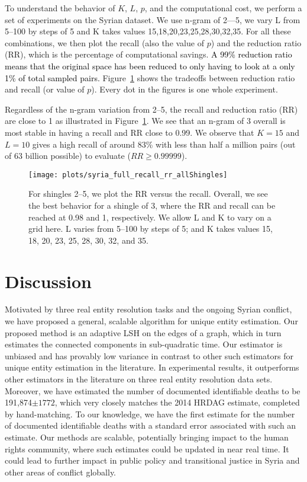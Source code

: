 \documentclass{imsart}
\begin{document}
To understand the behavior of $K$, $L$, $p$, and the computational cost, we perform a set of experiments on the Syrian dataset.  We use n-gram of 2---5, we vary L from 5--100 by steps of 5 and K takes values 15,18,20,23,25,28,30,32,35. For all these combinations, we then plot the recall (also the value of $p$) and the reduction ratio (RR), which is the percentage of computational savings. \textcolor{black}{A 99\% reduction ratio means that the original space has been reduced to only having to look at a
only 1\% of total sampled pairs.} Figure~\ref{syria-takethatAssad} shows the tradeoffs between reduction ratio and recall (or value of $p$). Every dot in the figures is one whole experiment.

Regardless of the n-gram variation from 2--5, the recall and reduction ratio (RR) are close to 1 as illustrated in Figure~\ref{syria-takethatAssad}. We see that an n-gram of 3 overall is most stable in having a recall and RR close to 0.99. We observe that $K=15$ and $L=10$ gives a high recall of around 83\% with less than half a million pairs (out of 63 billion possible) to evaluate ($RR \ge 0.99999$).

\begin{figure}[htbp]
\begin{center}
\texttt{[image: plots/syria\_full\_recall\_rr\_allShingles]}
\caption{For shingles 2--5, we plot the RR versus the recall. Overall, we see the best behavior for a shingle of 3, where the RR and recall can be reached at 0.98 and 1, respectively. We allow L and K to vary on a grid here. L varies from 5--100 by steps of 5; and K takes values 15, 18, 20, 23, 25, 28, 30, 32, and 35.}
\label{syria-takethatAssad}
\end{center}
\end{figure}


\section{Discussion}
Motivated by three real entity resolution tasks and the ongoing Syrian conflict, we have proposed a general, scalable algorithm for unique entity estimation. Our proposed method is an adaptive LSH on the edges of a graph, which in turn estimates the connected components in sub-quadratic time. Our estimator is unbiased and has provably low variance in contrast to other such estimators for unique entity estimation in the literature. In experimental results, it outperforms other estimators in the literature on three real entity resolution data sets. Moreover, we have estimated the number of documented identifiable deaths to be 191,874$ \pm 1772$, which very closely matches the 2014 HRDAG estimate, completed by hand-matching. To our knowledge, we have the first estimate for the number of documented identifiable deaths with a standard error associated with such an estimate. Our methods are scalable, potentially bringing impact to the human rights community, where such estimates could be updated in near real time. It could lead to further impact in public policy and transitional justice in Syria and other areas of conflict globally.
\end{document}
